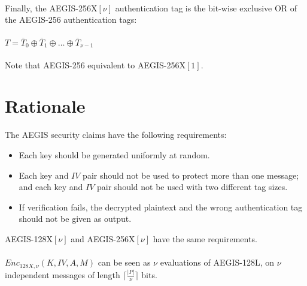 \documentclass[envcountsame,runningheads,notitlepage]{llncs}
\begin{document}
\paragraph{}

Finally, the AEGIS-256X$[\nu]$ authentication tag is the bit-wise exclusive OR of the AEGIS-256 authentication tags:

\paragraph{}

\begin{math}
  T = \overline{T}_0 \oplus \overline{T}_1 \oplus \ldots \oplus \overline{T}_{\nu-1}
\end{math}

\paragraph{}

Note that AEGIS-256 equivalent to AEGIS-256X$[1]$.

\section{Rationale}
\label{sec:rationale}

The AEGIS security claims have the following requirements:

\begin{itemize}
  \item Each key should be generated uniformly at random.
  \item Each key and $IV$ pair should not be used to protect more than one message; and each key and $IV$ pair should not be used with two different tag sizes.
  \item If verification fails, the decrypted plaintext and the wrong authentication tag should not be given as output.
\end{itemize}

AEGIS-128X$[\nu]$ and AEGIS-256X$[\nu]$ have the same requirements.

\paragraph{}

$Enc_{128X,\nu}(K, IV, A, M)$ can be seen as $\nu$ evaluations of AEGIS-128L, on $\nu$ independent messages of length $\lceil \frac{\lvert P \rvert}{\nu} \rceil$ bits.
\end{document}
